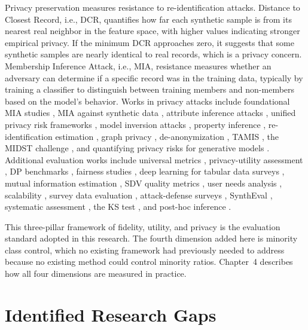 Privacy preservation measures resistance to re-identification attacks. Distance to Closest Record, i.e., DCR, quantifies how far each synthetic sample is from its nearest real neighbor in the feature space, with higher values indicating stronger empirical privacy. If the minimum DCR approaches zero, it suggests that some synthetic samples are nearly identical to real records, which is a privacy concern. Membership Inference Attack, i.e., MIA, resistance measures whether an adversary can determine if a specific record was in the training data, typically by training a classifier to distinguish between training members and non-members based on the model's behavior. Works in privacy attacks include foundational MIA studies \cite{shokri2017mia, carlini2022mia, yeom2018privacy}, MIA against synthetic data \cite{vanbreugel2023mia, chen2020miahealth, hu2024empirical}, attribute inference attacks \cite{giomi2023linear}, unified privacy risk frameworks \cite{giomi2023unified}, model inversion attacks \cite{fredrikson2015model}, property inference \cite{ganju2018property}, re-identification estimation \cite{rocher2019estimating}, graph privacy \cite{wu2022linkteller}, de-anonymization \cite{narayanan2008robust}, TAMIS \cite{meeus2024tamis}, the MIDST challenge \cite{meeus2024midst}, and quantifying privacy risks for generative models \cite{stadler2023quantifying}. Additional evaluation works include universal metrics \cite{platzer2021universal}, privacy-utility assessment \cite{emam2022assessment}, DP benchmarks \cite{tao2021benchmark, liu2024benchmarking}, fairness studies \cite{ganev2024fair}, deep learning for tabular data surveys \cite{borisov2022deep}, mutual information estimation \cite{kraskov2004mutual}, SDV quality metrics \cite{patki2016sdv}, user needs analysis \cite{kolsch2024navigating}, scalability \cite{wang2024scaling}, survey data evaluation \cite{snoke2018synthetic}, attack-defense surveys \cite{bellovin2024synthtab}, SynthEval \cite{lautrup2024syntheval}, systematic assessment \cite{chundawat2022systematic}, the KS test \cite{massey1951ks}, and post-hoc inference \cite{wang2024unlocking}.

This three-pillar framework of fidelity, utility, and privacy is the evaluation standard adopted in this research. The fourth dimension added here is minority class control, which no existing framework had previously needed to address because no existing method could control minority ratios. Chapter~4 describes how all four dimensions are measured in practice.

\section{Identified Research Gaps}

